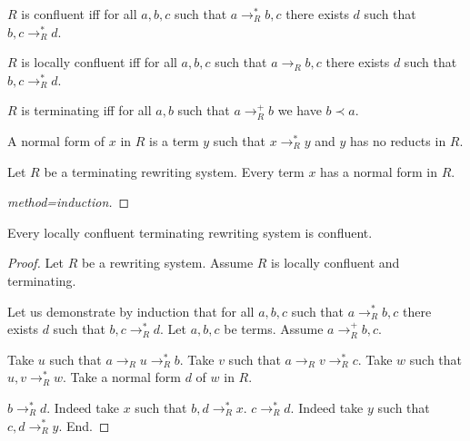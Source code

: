 \documentclass[english]{article}
\newcommand{\reduces}[1]{\to_{#1}}
\newcommand{\reducesTC}[1]{\to_{#1}^{+}}
\newcommand{\reducesTCR}[1]{\to_{#1}^{*}}
\begin{document}
\begin{forthel}
    \begin{definition}
      $R$ is confluent iff for all $a,b,c$ such that $a \reducesTCR{R} b,c$ there exists $d$ such that $b,c \reducesTCR{R} d$.
    \end{definition}

    \begin{definition}
      $R$ is locally confluent iff for all $a, b, c$ such that
      $a \reduces{R} b, c$
      there exists $d$ such that $b, c \reducesTCR{R} d$.
    \end{definition}

    \begin{definition}[title=Terminating]
      $R$ is terminating iff
      for all $a, b$ such that $a \reducesTC{R} b$ we have $b \prec a$.
    \end{definition}

    \begin{definition}
      A normal form of $x$ in $R$ is a term $y$ such that
      $x \reducesTCR{R} y$ and $y$ has no reducts in $R$.
    \end{definition}

    \begin{lemma}
      Let $R$ be a terminating rewriting system.
      Every term $x$ has a normal form in $R$.
    \end{lemma}
    \begin{proof}[method=induction]
    \end{proof}


    \begin{lemma}[title=Newman]
      Every locally confluent terminating rewriting system is confluent.
    \end{lemma}
    \begin{proof}
      Let $R$ be a rewriting system. Assume $R$ is locally confluent and
      terminating.

      Let us demonstrate by induction that for all $a,b,c$ such that $a \reducesTCR{R} b,c$ there exists $d$ such that $b,c \reducesTCR{R} d$.
        Let $a,b,c$ be terms. Assume $a \reducesTC{R} b,c$.

        Take $u$ such that $a \reduces{R} u \reducesTCR{R} b$.
        Take $v$ such that $a \reduces{R} v \reducesTCR{R} c$.
        Take $w$ such that $u,v \reducesTCR{R} w$.
        Take a normal form $d$ of $w$ in $R$.

        $b \reducesTCR{R} d$. Indeed take $x$ such that $b,d \reducesTCR{R} x$. 
        $c \reducesTCR{R} d$. Indeed take $y$ such that $c,d \reducesTCR{R} y$.
      End.
    \end{proof}
  \end{forthel}
\end{document}
